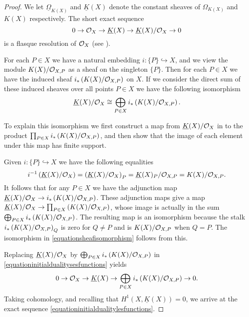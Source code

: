     \begin{proof}
    We let $\underline{\Omega}_{K(X)}$ and $\underline{K}(X)$ denote the constant sheaves of $\Omega_{K(X)}$ and $K(X)$ respectively.
    The short exact sequence
        \begin{equation}\label{equationinitialdualitysesfunctions}
        0 \rightarrow {\cal O}_X \rightarrow \underline{K}(X) \rightarrow \underline{K}(X)/{\cal O}_X \rightarrow 0
        \end{equation}
    is a flasque resolution of ${\cal O}_X$ (see \cite[Chap.\ II, ex.\ 1.16]{hart}).
    
    For each $P \in X$ we have a natural embedding $i\colon \{P\} \hookrightarrow X$, and we view the module $K(X)/{\cal O}_{X,P}$ as a sheaf on the singleton $\{P\}$.
    Then for each $P\in X$ we have the induced sheaf $i_*\left( K(X)/{\cal O}_{X,P} \right)$ on $X$.
    If we consider the direct sum of these induced sheaves over all points $P\in X$ we have the following isomorphism
        \begin{equation}\label{equationsheafisomorphism}
        \underline{K}(X)/{\cal O}_X\cong \bigoplus_{P\in X} i_*\left(K(X)/{\cal O}_{X,P}\right).
        \end{equation}
    
    
    To explain this isomorphism we first construct a map from $\underline{K}(X)/{\cal O}_X$ in to the product $\prod_{P \in X} i_*\left({K(X)}/{\cal O}_{X,P}\right)$, and then show that the image of each element under this map has finite support.
    
    Given $i\colon \{P\} \hookrightarrow X$ we have the following equalities
        \begin{equation*}
        i^{-1}\left(\underline{K}(X)/{\cal O}_X\right) = \left(\underline{K}(X)/{\cal O}_X\right)_P  = \underline{K}(X)_P/{\cal O}_{X,P}  = K(X)/{\cal O}_{X,P}.
        \end{equation*}
    It follows that for any $P \in X$ we have the adjunction map $\underline{K}(X)/{\cal O}_X \rightarrow i_* \left( K(X)/{\cal O}_{X,P} \right)$.
    These adjunction maps give a map $\underline{K}(X)/{\cal O}_X \rightarrow \prod_{P \in X}\left( K(X)/{\cal O}_{X,P} \right)$, whose image is actually in the sum $\bigoplus_{P \in X} i_*\left(K(X)/{\cal O}_{X,P} \right)$.
    The resulting map is an isomorphism because the stalk $i_*\left( K(X)/{\cal O}_{X,P} \right)_Q$ is zero for $Q \neq P$ and is $K(X)/{\cal O}_{X,P}$ when $Q = P$. 
    The isomorphism in \eqref{equationsheafisomorphism} follows from this.
    
    Replacing $\underline{K}(X)/{\cal O}_X$ by $\bigoplus_{P\in X} i_*\left(K(X)/{\cal O}_{X,P}\right)$ in \eqref{equationinitialdualitysesfunctions} yields
        \begin{equation}\label{equationshortexactsequencefunctionsdirectsum}
        0 \rightarrow {\cal O}_X \rightarrow \underline{K}(X) \rightarrow \bigoplus_{P \in X}i_* \left( K(X)/{\cal O}_{X,P} \right) \rightarrow 0.
        \end{equation}
    Taking cohomology, and recalling that $H^1(X,\underline{K}(X)) = 0$, we arrive at the exact sequence \eqref{equationinitialdualitylesfunctions}.
    

\end{proof}
